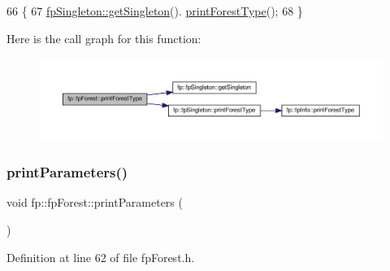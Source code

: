 \begin{DoxyCode}
66                                          \{
67                 \hyperlink{classfp_1_1fpSingleton_a8bdae77b68521003e3fc630edec2e240}{fpSingleton::getSingleton}().
      \hyperlink{classfp_1_1fpSingleton_ad9696336521f72c7c6a021608799871e}{printForestType}();
68             \}
\end{DoxyCode}
Here is the call graph for this function\+:\nopagebreak
\begin{figure}[H]
\begin{center}
\leavevmode
\includegraphics[width=350pt]{classfp_1_1fpForest_a4a7ffa92224570d6a97eff8bd5e9b0fa_cgraph}
\end{center}
\end{figure}
\mbox{\label{classfp_1_1fpForest_ae096def0ca26f0771b27341d7b218066}} 
\subsubsection{\texorpdfstring{print\+Parameters()}{printParameters()}}
{\footnotesize\ttfamily void fp\+::fp\+Forest\+::print\+Parameters (\begin{DoxyParamCaption}{ }\end{DoxyParamCaption})\hspace{0.3cm}{\ttfamily [inline]}}



Definition at line 62 of file fp\+Forest.\+h.



